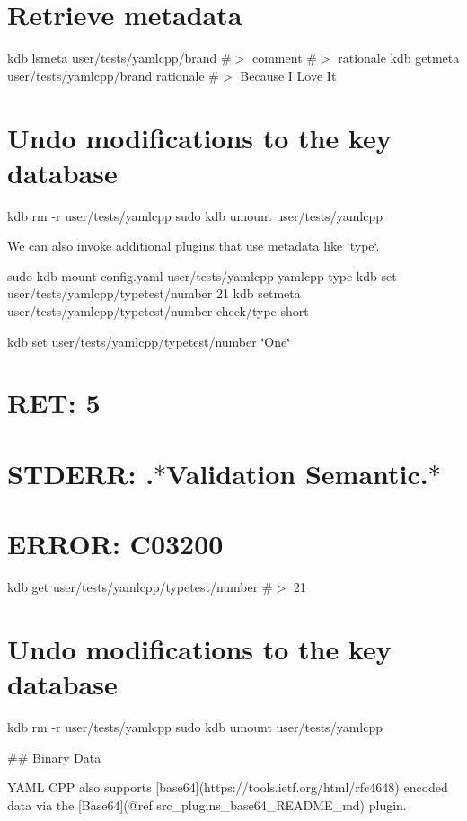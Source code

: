 \section*{Retrieve metadata}

kdb lsmeta user/tests/yamlcpp/brand \#$>$ comment \#$>$ rationale kdb getmeta user/tests/yamlcpp/brand rationale \#$>$ Because I Love It

\section*{Undo modifications to the key database}

kdb rm -\/r user/tests/yamlcpp sudo kdb umount user/tests/yamlcpp 
\begin{DoxyCode}
We can also invoke additional plugins that use metadata like `type`.
\end{DoxyCode}
 sudo kdb mount config.\+yaml user/tests/yamlcpp yamlcpp type kdb set user/tests/yamlcpp/typetest/number 21 kdb setmeta user/tests/yamlcpp/typetest/number check/type short

kdb set user/tests/yamlcpp/typetest/number \char`\"{}\+One\char`\"{} \section*{R\+ET\+: 5}

\section*{S\+T\+D\+E\+RR\+: .$\ast$\+Validation Semantic.$\ast$}

\section*{E\+R\+R\+OR\+: C03200}

kdb get user/tests/yamlcpp/typetest/number \#$>$ 21

\section*{Undo modifications to the key database}

kdb rm -\/r user/tests/yamlcpp sudo kdb umount user/tests/yamlcpp 
\begin{DoxyCode}
## Binary Data

YAML CPP also supports [base64](https://tools.ietf.org/html/rfc4648) encoded data via the [Base64](@ref
       src\_plugins\_base64\_README\_md) plugin.
\end{DoxyCode}
